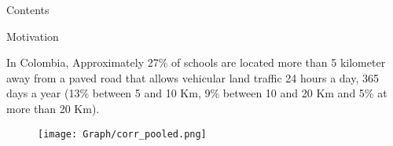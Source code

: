 \documentclass[9pt]{beamer}
\begin{document}
%
%
 
\begin{frame}{Contents}
    \tableofcontents
\end{frame}

\begin{frame}{Motivation}

\justifying \small
In Colombia, Approximately  27\% of schools are located more than 5 kilometer away from a paved road that allows vehicular land traffic 24 hours a day, 365 days a year (13\% between 5 and 10 Km, 9\% between 10 and 20 Km and 5\% at more than 20 Km). 

\begin{figure}[h!]
    \centering
    \renewcommand\thefigure{4.1}
     \texttt{[image: Graph/corr\_pooled.png]}
    \caption{} \label{fig:Figdispertion}
\end{figure}
     
\end{frame}




         

\end{document}
